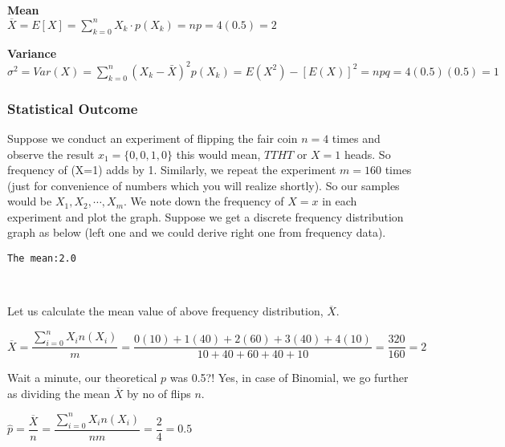 \documentclass[float=false,crop=false]{standalone}
\begin{document}
\textbf{Mean}\\
\(\overline{X} = E[X] = \sum\limits_{k=0}^nX_k \cdot p(X_k) = np = 4(0.5) = 2\)

\textbf{Variance}\\
\(\sigma^2 = Var(X) = \sum\limits_{k=0}^n (X_{k}-\bar{X})^2p(X_k) = E(X^2) - [E(X)]^2 = npq = 4(0.5)(0.5) = 1\)

    \subsubsection{Statistical Outcome}\label{statistical-outcome}

Suppose we conduct an experiment of flipping the fair coin \(n=4\) times
and observe the result \(x_1 = \{ 0,0,1,0 \}\) this would mean, \(TTHT\)
or \(X=1\) heads. So frequency of (X=1) adds by 1. Similarly, we repeat
the experiment \(m=160\) times (just for convenience of numbers which
you will realize shortly). So our samples would be
\(X_1,X_2,\cdots,X_m\). We note down the frequency of \(X=x\) in each
experiment and plot the graph. Suppose we get a discrete frequency
distribution graph as below (left one and we could derive right one from
frequency data).
    \begin{Verbatim}[commandchars=\\\{\},fontsize=\footnotesize]
The mean:2.0

    \end{Verbatim}

    \begin{center}
    \end{center}
    { \hspace*{\fill} \\}
    
    Let us calculate the mean value of above frequency distribution,
\(\overline{X}\).

\(\overline{X} = \dfrac{\sum\limits_{i=0}^{n}X_in(X_i)}{m} = \dfrac{ 0(10) + 1(40) + 2(60) + 3(40) + 4(10) }{ 10 + 40 + 60 + 40 + 10 } = \dfrac{320}{160} = 2 \nonumber\)

Wait a minute, our theoretical \(p\) was 0.5?! Yes, in case of Binomial,
we go further as dividing the mean \(\overline{X}\) by no of flips
\(n\).

\(\hat{p} = \dfrac{\overline{X}}{n} = \dfrac{\sum\limits_{i=0}^{n}X_in(X_i)}{nm} = \dfrac{2}{4} = 0.5\)
\end{document}

